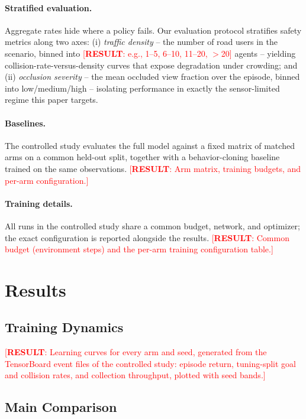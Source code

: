 \documentclass{article}
\newcommand{\results}[1]{\textcolor{red}{[\textbf{RESULT}: #1]}}
\begin{document}
\paragraph{Stratified evaluation.}
Aggregate rates hide where a policy fails. Our evaluation protocol stratifies
safety metrics along two axes: (i) \emph{traffic density} -- the number of
road users in the scenario, binned into \results{e.g., 1--5, 6--10, 11--20,
$>$20} agents -- yielding collision-rate-versus-density curves that expose
degradation under crowding; and (ii) \emph{occlusion severity} -- the mean
occluded view fraction over the episode, binned into low/medium/high --
isolating performance in exactly the sensor-limited regime this paper
targets.

\paragraph{Baselines.}
The controlled study evaluates the full model against a fixed matrix of
matched arms on a common held-out split, together with a behavior-cloning
baseline trained on the same observations. \results{Arm matrix, training
budgets, and per-arm configuration.}

\paragraph{Training details.}
All runs in the controlled study share a common budget, network, and
optimizer; the exact configuration is reported alongside the results.
\results{Common budget (environment steps) and the per-arm training
configuration table.}

\section{Results}
\label{sec:results}

\subsection{Training Dynamics}
\label{sec:training-results}

\results{Learning curves for every arm and seed, generated from the
TensorBoard event files of the controlled study: episode return,
tuning-split goal and collision rates, and collection throughput, plotted
with seed bands.}

\subsection{Main Comparison}
\end{document}
